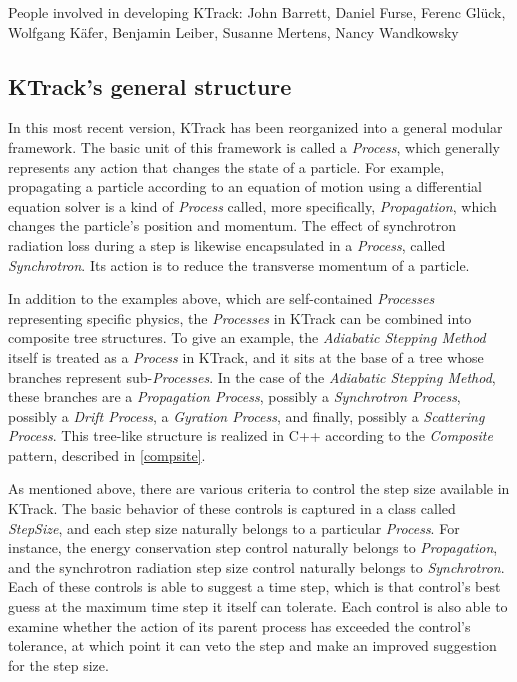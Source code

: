 People involved in developing KTrack:
John Barrett, Daniel Furse, Ferenc Gl\"uck, Wolfgang K\"afer, Benjamin Leiber, Susanne Mertens, Nancy Wandkowsky

\subsection{KTrack's general structure}

In this most recent version, KTrack has been reorganized into a general modular framework.  The basic unit of this framework is called a \textit{Process}, which generally represents any action that changes the state of a particle.  For example, propagating a particle according to an equation of motion using a differential equation solver is a kind of \textit{Process} called, more specifically, \textit{Propagation}, which changes the particle's position and momentum.  The effect of synchrotron radiation loss during a step is likewise encapsulated in a \textit{Process}, called \textit{Synchrotron}.  Its action is to reduce the transverse momentum of a particle.

In addition to the examples above, which are self-contained \textit{Processes} representing specific physics, the \textit{Processes} in KTrack can be combined into composite tree structures.  To give an example, the \textit{Adiabatic Stepping Method} itself is treated as a \textit{Process} in KTrack, and it sits at the base of a tree whose branches represent sub-\textit{Processes}.  In the case of the \textit{Adiabatic Stepping Method}, these branches are a \textit{Propagation Process}, possibly a \textit{Synchrotron Process}, possibly a \textit{Drift Process}, a \textit{Gyration Process}, and finally, possibly a \textit{Scattering Process}.  This tree-like structure is realized in C++ according to the \textit{Composite} pattern, described in \ref{compsite}.

As mentioned above, there are various criteria to control the step size available in KTrack.  The basic behavior of these controls is captured in a class called \textit{StepSize}, and each step size naturally belongs to a particular \textit{Process}.  For instance, the energy conservation step control naturally belongs to \textit{Propagation}, and the synchrotron radiation step size control naturally belongs to \textit{Synchrotron}.  Each of these controls is able to suggest a time step, which is that control's best guess at the maximum time step it itself can tolerate.  Each control is also able to examine whether the action of its parent process has exceeded the control's tolerance, at which point it can veto the step and make an improved suggestion for the step size.

